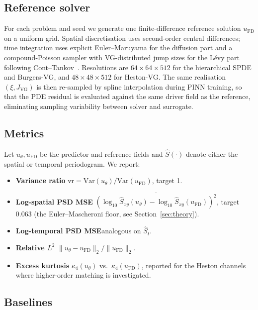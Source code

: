 \documentclass[review,12pt]{elsarticle}
\begin{document}
\subsection{Reference solver}

For each problem and seed we generate one finite-difference
reference solution \(u_{\mathrm{FD}}\) on a uniform grid. Spatial
discretisation uses second-order central differences; time
integration uses explicit Euler--Maruyama for the diffusion part
and a compound-Poisson sampler with VG-distributed jump sizes for
the L\'evy part following Cont--Tankov~\cite{ContTankov2003}.
Resolutions are \(64\times 64 \times 512\) for the hierarchical
SPDE and Burgers-VG, and \(48\times 48 \times 512\) for
Heston-VG. The same realisation \((\xi, J_{\mathrm{VG}})\) is then
re-sampled by spline interpolation during PINN training, so that
the PDE residual is evaluated against the same driver field as
the reference, eliminating sampling variability between solver and
surrogate.

\subsection{Metrics}
\label{subsec:metrics}

Let \(u_\theta, u_{\mathrm{FD}}\) be the predictor and reference
fields and \(\widehat S(\cdot)\) denote either the spatial or
temporal periodogram. We report:
\begin{itemize}
\item \textbf{Variance ratio}\quad
\(\mathrm{vr} = \mathrm{Var}(u_\theta)/\mathrm{Var}(u_{\mathrm{FD}})\),
target 1.
\item \textbf{Log-spatial PSD MSE}\quad
\(\overline{(\log_{10}\widehat S_{xy}(u_\theta) -
\log_{10}\widehat S_{xy}(u_{\mathrm{FD}}))^2}\), target 0.063
(the Euler--Mascheroni floor, see Section~\ref{sec:theory}).
\item \textbf{Log-temporal PSD MSE}\quad analogous on
\(\widehat S_t\).
\item \textbf{Relative \(L^2\)}\quad
\(\|u_\theta - u_{\mathrm{FD}}\|_2 / \|u_{\mathrm{FD}}\|_2\).
\item \textbf{Excess kurtosis}\quad
\(\kappa_4(u_\theta)\) vs.\ \(\kappa_4(u_{\mathrm{FD}})\), reported
for the Heston channels where higher-order matching is investigated.
\end{itemize}

\subsection{Baselines}
\end{document}

